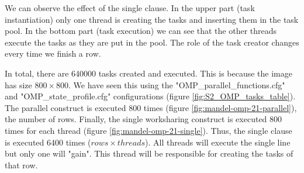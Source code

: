 \documentclass[12pt, a4paper]{article}
\begin{document}
We can observe the effect of the single clause. In the upper part (task instantiation) only one thread is creating the tasks and inserting them in the task pool. In the bottom part (task execution) we can see that the other threads execute the tasks as they are put in the pool. The role of the task creator changes every time we finish a row.

In total, there are 640000 tasks created and executed. This is because the image has size $800 \times 800$. We have seen this using the "OMP\_parallel\_functions.cfg" and "OMP\_state\_profile.cfg" configurations (figure \ref{fig:S2_OMP_tasks_table}). The parallel construct is executed 800 times (figure \ref{fig:mandel-omp-21-parallel}), the number of rows. Finally, the single worksharing construct is executed 800 times for each thread (figure \ref{fig:mandel-omp-21-single}). Thus, the single clause is executed 6400 times ($rows \times threads$). All threads will execute the single line but only one will "gain". This thread will be responsible for creating the tasks of that row.
\end{document}

